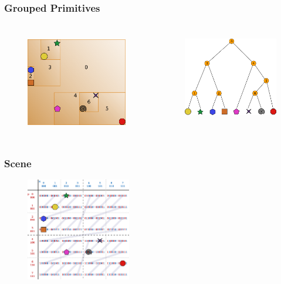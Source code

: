 \documentclass{beamer}
\begin{document}
\begin{frame}
  \frametitle{Grouped Primitives}
  
\begin{columns}[t]

\begin{figure}
\includegraphics[height=45mm]{primitive-box.png}
\end{figure}

\begin{figure}
\includegraphics[height=40mm]{primitive_tree_narrow.png}
\end{figure}
\end{columns}
\end{frame}

\begin{frame}
  \frametitle{Scene}
\begin{figure}
\includegraphics[height=45mm]{Z-curve-primitives.png}
\end{figure}
\end{frame}
\end{document}

